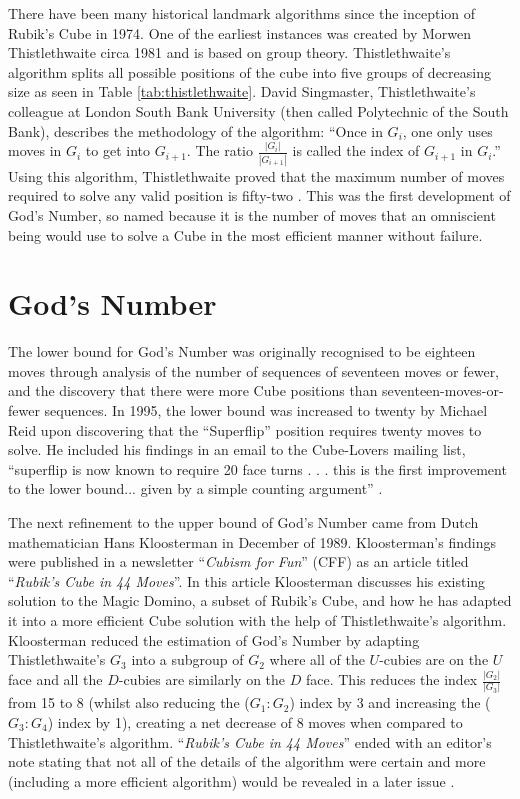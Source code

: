 \documentclass{report}
\newcommand{\tit}[1]{\textit{#1}}
\newcommand{\propernoun}[1]{\enquote{\tit{#1}}}
\begin{document}
    There have been many historical landmark algorithms since the inception of Rubik's Cube in 1974. One of the earliest instances was created by Morwen Thistlethwaite circa 1981 and is based on group theory. Thistlethwaite's algorithm splits all possible positions of the cube into five groups of decreasing size as seen in Table \ref{tab:thistlethwaite}. David Singmaster, Thistlethwaite's colleague at London South Bank University (then called Polytechnic of the South Bank), describes the methodology of the algorithm: \enquote{Once in $G_i$, one only uses moves in $G_i$ to get into $G_{i+1}$. The ratio $\frac{|G_i|}{|G_{i+1}|}$ is called the index of $G_{i+1}$ in $G_i$.} Using this algorithm, Thistlethwaite proved that the maximum number of moves required to solve any valid position is fifty-two \cite{Singmaster1981}. This was the first development of God's Number, so named because it is the number of moves that an omniscient being would use to solve a Cube in the most efficient manner without failure.
    
    \section{God's Number}
    The lower bound for God's Number was originally recognised to be eighteen moves through analysis of the number of sequences of seventeen moves or fewer, and the discovery that there were more Cube positions than seventeen-moves-or-fewer sequences. In 1995, the lower bound was increased to twenty by Michael Reid upon discovering that the \enquote{Superflip} position requires twenty moves to solve. He included his findings in an email to the Cube-Lovers mailing list, \enquote{superflip is now known to require 20 face turns . . . this is the first improvement to the lower bound... given by a simple counting argument} \cite{Reid1995}.
    
    The next refinement to the upper bound of God's Number came from Dutch mathematician Hans Kloosterman in December of 1989. Kloosterman's findings were published in a newsletter \propernoun{Cubism for Fun} (CFF) as an article titled \propernoun{Rubik's Cube in 44 Moves}. In this article Kloosterman discusses his existing solution to the Magic Domino, a subset of Rubik's Cube, and how he has adapted it into a more efficient Cube solution with the help of Thistlethwaite's algorithm. Kloosterman reduced the estimation of God's Number by adapting Thistlethwaite's $G_3$ into a subgroup of $G_2$ where all of the $U$-cubies are on the $U$ face and all the $D$-cubies are similarly on the $D$ face. This reduces the index $\frac{|G_2|}{|G_3|}$ from 15 to 8 (whilst also reducing the ($G_1:G_2$) index by 3 and increasing the ($G_3:G_4$) index by 1), creating a net decrease of 8 moves when compared to Thistlethwaite's algorithm. \propernoun{Rubik's Cube in 44 Moves} ended with an editor's note stating that not all of the details of the algorithm were certain and more (including a more efficient algorithm) would be revealed in a later issue \cite{Kloosterman1989}.
    
\end{document}
